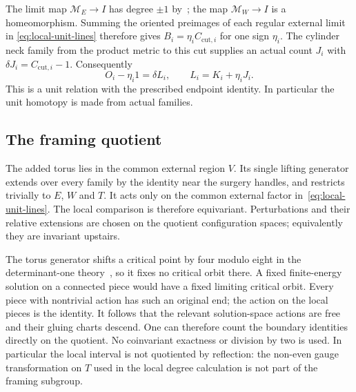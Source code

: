 \documentclass[11pt]{amsart}
\theoremstyle{definition}
\theoremstyle{remark}
\theoremstyle{plain}
\begin{document}
The limit map $\mathcal M_E\to I$ has degree $\pm1$
by~\cite[Lemmas~5.5--5.7]{Scaduto}; the map
$\mathcal M_W\to I$ is a homeomorphism. Summing the oriented
preimages of each regular external limit in
\eqref{eq:local-unit-lines} therefore gives
$B_i=\eta_i C_{\mathrm{cut},i}$ for one sign $\eta_i$.
The cylinder neck family from the product metric to this cut
supplies an actual count $J_i$ with
$\delta J_i=C_{\mathrm{cut},i}-1$. Consequently
\begin{equation}\label{eq:triangle-unit}
 O_i-\eta_i1=\delta L_i,\qquad L_i=K_i+\eta_iJ_i.
\end{equation}
This is a unit relation with the prescribed endpoint identity.
In particular the unit homotopy is made from actual families.

\subsection{The framing quotient}
The added torus lies in the common external region $V$. Its
single lifting generator extends over every family by the
identity near the surgery handles, and restricts trivially to
$E$, $W$ and $T$. It acts only on the common external factor
in~\eqref{eq:local-unit-lines}. The local comparison is therefore
equivariant. Perturbations and their relative extensions are
chosen on the quotient configuration spaces; equivalently they
are invariant upstairs.

The torus generator shifts a critical point by four modulo eight
in the determinant-one theory~\cite[Section~7.1]{Scaduto}, so it
fixes no critical orbit there. A fixed finite-energy solution on
a connected piece would have a fixed limiting critical orbit.
Every piece with nontrivial action has such an original end;
the action on the local pieces is the identity. It follows that
the relevant solution-space actions are free and their gluing
charts descend. One can therefore count the boundary identities
directly on the quotient. No coinvariant exactness or division
by two is used. In particular the local interval is not quotiented
by reflection: the non-even gauge transformation on $T$ used in
the local degree calculation is not part of the framing subgroup.
\end{document}

